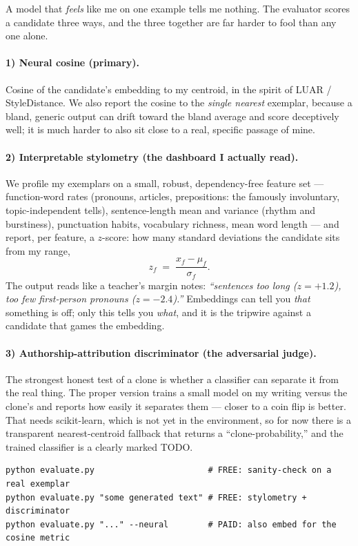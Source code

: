 \documentclass[11pt]{article}
\begin{document}
A model that \emph{feels} like me on one example tells me nothing. The evaluator scores a candidate
three ways, and the three together are far harder to fool than any one alone.

\paragraph{1) Neural cosine (primary).} Cosine of the candidate's embedding to my centroid, in the
spirit of LUAR / StyleDistance. We also report the cosine to the \emph{single nearest} exemplar,
because a bland, generic output can drift toward the bland average and score deceptively well; it is
much harder to also sit close to a real, specific passage of mine.

\paragraph{2) Interpretable stylometry (the dashboard I actually read).} We profile my exemplars on a
small, robust, dependency-free feature set --- function-word rates (pronouns, articles, prepositions:
the famously involuntary, topic-independent tells), sentence-length mean and variance (rhythm and
burstiness), punctuation habits, vocabulary richness, mean word length --- and report, per feature, a
$z$-score: how many standard deviations the candidate sits from my range,
\[
  z_f \;=\; \frac{x_f - \mu_f}{\sigma_f}.
\]
The output reads like a teacher's margin notes: \emph{``sentences too long ($z=+1.2$), too few
first-person pronouns ($z=-2.4$).''} Embeddings can tell you \emph{that} something is off; only this
tells you \emph{what}, and it is the tripwire against a candidate that games the embedding.

\paragraph{3) Authorship-attribution discriminator (the adversarial judge).} The strongest honest
test of a clone is whether a classifier can separate it from the real thing. The proper version
trains a small model on my writing versus the clone's and reports how easily it separates them ---
closer to a coin flip is better. That needs scikit-learn, which is not yet in the environment, so for
now there is a transparent nearest-centroid fallback that returns a ``clone-probability,'' and the
trained classifier is a clearly marked TODO.

\begin{lstlisting}
python evaluate.py                       # FREE: sanity-check on a real exemplar
python evaluate.py "some generated text" # FREE: stylometry + discriminator
python evaluate.py "..." --neural        # PAID: also embed for the cosine metric
\end{lstlisting}
\end{document}

